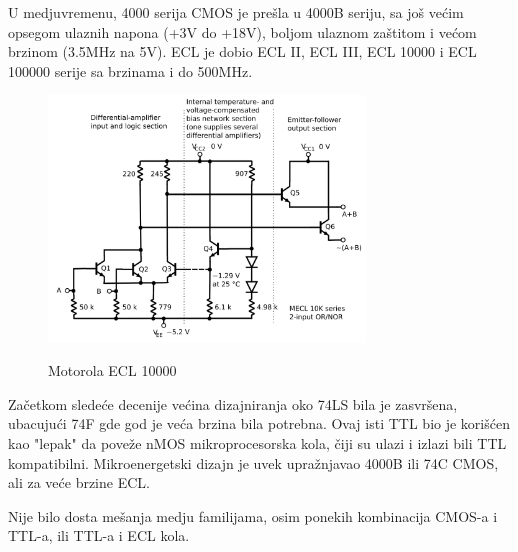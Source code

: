 \documentclass[12pt,a4paper]{article}
\begin{document}
U medjuvremenu, 4000 serija CMOS je prešla u 4000B seriju, sa još većim opsegom ulaznih napona (+3V do +18V), boljom ulaznom zaštitom i većom brzinom (3.5MHz na 5V). 
ECL je dobio ECL II, ECL III, ECL 10000 i ECL 100000 serije sa brzinama i do 500MHz.
\begin{figure}[h]
  \centering
  \includegraphics[width=0.75\textwidth]{ECL}
  \caption{Motorola ECL 10000}\cite{ecl}
\end{figure}
Začetkom sledeće decenije većina dizajniranja oko 74LS bila je zasvršena, ubacujući 74F gde god je veća brzina bila potrebna. Ovaj isti TTL bio je korišćen kao "lepak" da poveže nMOS mikroprocesorska kola, čiji su ulazi i izlazi bili TTL kompatibilni. 
Mikroenergetski dizajn je uvek upražnjavao 4000B ili 74C CMOS, ali za veće brzine ECL.

\newpage

Nije bilo dosta mešanja medju familijama, osim ponekih kombinacija CMOS-a i TTL-a, ili TTL-a i ECL kola.
\end{document}
